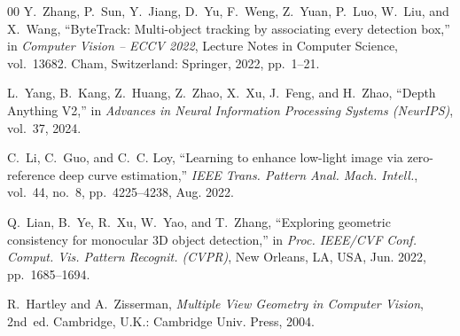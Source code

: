 \documentclass[conference]{IEEEtran}
\begin{document}
\begin{thebibliography}{00}
Y.~Zhang, P.~Sun, Y.~Jiang, D.~Yu, F.~Weng, Z.~Yuan, P.~Luo, W.~Liu, and
X.~Wang, ``ByteTrack: Multi-object tracking by associating every detection
box,'' in \textit{Computer Vision -- ECCV 2022}, Lecture Notes in Computer
Science, vol.~13682. Cham, Switzerland: Springer, 2022, pp.~1--21.

L.~Yang, B.~Kang, Z.~Huang, Z.~Zhao, X.~Xu, J.~Feng, and H.~Zhao, ``Depth
Anything V2,'' in \textit{Advances in Neural Information Processing Systems
(NeurIPS)}, vol.~37, 2024.

C.~Li, C.~Guo, and C.~C. Loy, ``Learning to enhance low-light image via
zero-reference deep curve estimation,'' \textit{IEEE Trans. Pattern Anal. Mach.
Intell.}, vol.~44, no.~8, pp.~4225--4238, Aug. 2022.

Q.~Lian, B.~Ye, R.~Xu, W.~Yao, and T.~Zhang, ``Exploring geometric consistency
for monocular 3D object detection,'' in \textit{Proc. IEEE/CVF Conf. Comput.
Vis. Pattern Recognit. (CVPR)}, New Orleans, LA, USA, Jun. 2022,
pp.~1685--1694.

R.~Hartley and A.~Zisserman, \textit{Multiple View Geometry in Computer Vision},
2nd~ed. Cambridge, U.K.: Cambridge Univ. Press, 2004.

\end{thebibliography}
\end{document}
